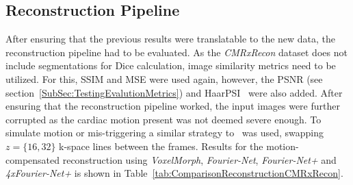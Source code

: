 \documentclass[english,version-2022-01]{uzl-thesis} %
\begin{document}
\subsection{Reconstruction Pipeline}
After ensuring that the previous results were translatable to the new data, the reconstruction pipeline had to be evaluated. As the \emph{CMRxRecon} dataset does not include segmentations for Dice calculation, image similarity metrics need to be utilized. For this, SSIM and MSE were used again, however, the PSNR (see section~\ref{SubSec:TestingEvalutionMetrics}) and HaarPSI~\cite{HaarPSI} were also added. After ensuring that the reconstruction pipeline worked, the input images were further corrupted as the cardiac motion present was not deemed severe enough. To simulate motion or mis-triggering a similar strategy to~\cite{Oksuz2020} was used, swapping $z=\{16,32\}$ k-space lines between the frames. Results for the motion-compensated reconstruction using \emph{VoxelMorph}, \emph{Fourier-Net}, \emph{Fourier-Net+} and \emph{4xFourier-Net+} is shown in Table~\ref{tab:ComparisonReconstructionCMRxRecon}.
\end{document}
